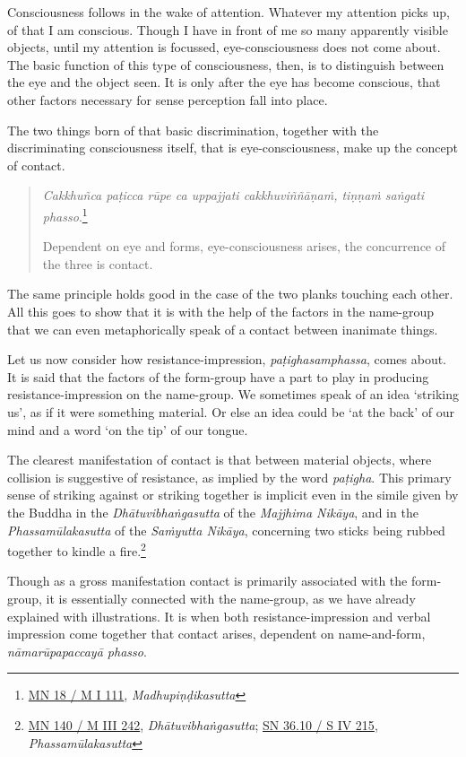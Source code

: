 Consciousness follows in the wake of attention. Whatever my attention picks up, of that I am conscious. Though I have in front of me so many apparently visible objects, until my attention is focussed, eye-consciousness does not come about. The basic function of this type of consciousness, then, is to distinguish between the eye and the object seen. It is only after the eye has become conscious, that other factors necessary for sense perception fall into place.

The two things born of that basic discrimination, together with the discriminating consciousness itself, that is eye-consciousness, make up the concept of contact.

\begin{quote}
\emph{Cakkhuñca paṭicca rūpe ca uppajjati cakkhuviññāṇaṁ, tiṇṇaṁ saṅgati phasso}.\footnote{\href{https://suttacentral.net/mn18/pli/ms}{MN 18 / M I 111}, \emph{Madhupiṇḍikasutta}}

Dependent on eye and forms, eye-consciousness arises, the concurrence of the three is contact.
\end{quote}

The same principle holds good in the case of the two planks touching each other. All this goes to show that it is with the help of the factors in the name-group that we can even metaphorically speak of a contact between inanimate things.

Let us now consider how resistance-impression, \emph{paṭighasamphassa}, comes about. It is said that the factors of the form-group have a part to play in producing resistance-impression on the name-group. We sometimes speak of an idea `striking us', as if it were something material. Or else an idea could be `at the back' of our mind and a word `on the tip' of our tongue.

The clearest manifestation of contact is that between material objects, where collision is suggestive of resistance, as implied by the word \emph{paṭigha}. This primary sense of striking against or striking together is implicit even in the simile given by the Buddha in the \emph{Dhātuvibhaṅgasutta} of the \emph{Majjhima Nikāya}, and in the \emph{Phassamūlakasutta} of the \emph{Saṁyutta Nikāya}, concerning two sticks being rubbed together to kindle a fire.\footnote{\href{https://suttacentral.net/mn140/pli/ms}{MN 140 / M III 242}, \emph{Dhātuvibhaṅgasutta}; \href{https://suttacentral.net/sn36.10/pli/ms}{SN 36.10 / S IV 215}, \emph{Phassamūlakasutta}}

Though as a gross manifestation contact is primarily associated with the form-group, it is essentially connected with the name-group, as we have already explained with illustrations. It is when both resistance-impression and verbal impression come together that contact arises, dependent on name-and-form, \emph{nāmarūpapaccayā phasso}.

